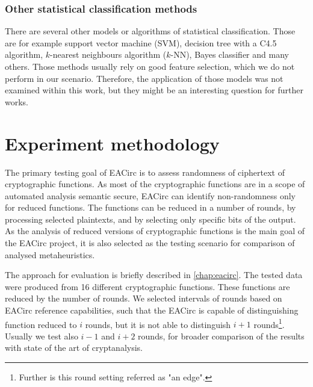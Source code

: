 \documentclass[
  print, %
  Table,   %
  nolof,     %
  nolot,     %
  11pt, %
  oneside  %
]{fithesis3}
\begin{document}

\subsection{Other statistical classification methods}


There are several other models or algorithms of statistical classification. Those are for example support vector machine (SVM), decision tree with a C4.5 algorithm, $k$-nearest neighbours algorithm ($k$-NN), Bayes classifier and many others. Those methods usually rely on good feature selection, which we do not perform in our scenario. Therefore, the application of those models was not examined within this work, but they might be an interesting question for further works.

\chapter{Experiment methodology}
\label{chap:method}

The primary testing goal of EACirc is to assess randomness of ciphertext of cryptographic functions. As most of the cryptographic functions are in a scope of automated analysis semantic secure, EACirc can identify non-randomness only for reduced functions. The functions can be reduced in a number of rounds, by processing selected plaintexts, and by selecting only specific bits of the output. As the analysis of reduced versions of cryptographic functions is the main goal of the EACirc project, it is also selected as the testing scenario for comparison of analysed metaheuristics.

The approach for evaluation is briefly described in \cref{chap:eacirc}. The tested data were produced from 16 different cryptographic functions. These functions are reduced by the number of rounds. We selected intervals of rounds based on EACirc reference capabilities, such that the EACirc is capable of distinguishing function reduced to $i$ rounds, but it is not able to distinguish $i+1$ rounds\footnote{Further is this round setting referred as "an edge".}. Usually we test also $i-1$ and $i+2$ rounds, for broader comparison of the results with state of the art of cryptanalysis.
\end{document}
